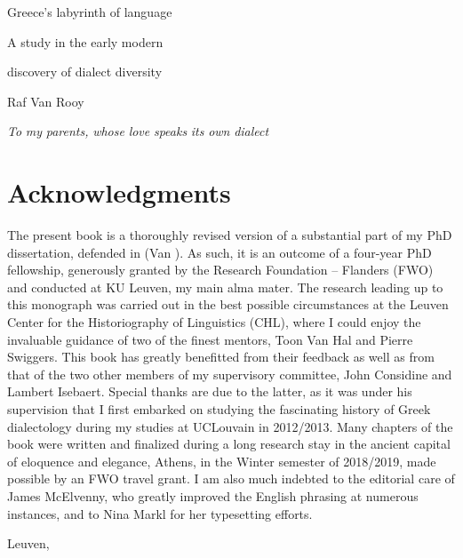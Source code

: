\documentclass[output=paper]{langsci/langscibook}
\author{\affiliation{}\orcid{}}
\title{}
\begin{document}
\maketitle 


Greece’s labyrinth of language

A study in the early modern

discovery of dialect diversity

Raf Van Rooy

\textit{To} \textit{my} \textit{parents,} \textit{whose} \textit{love} \textit{speaks} \textit{its} \textit{own} \textit{dialect}

\section{}
\hypertarget{Toc19704798}{}\setcounter{tocdepth}{3}
\renewcommand\contentsname{}
\tableofcontents

\section{Acknowledgments}
\hypertarget{Toc19704799}{}
The present book is a thoroughly revised version of a substantial part of my PhD dissertation, defended in \citealt{May2017} (Van \citealt{Rooy2017}). As such, it is an outcome of a four-year PhD fellowship, generously granted by the Research Foundation – Flanders (FWO) and conducted at KU Leuven, my main alma mater. The research leading up to this monograph was carried out in the best possible circumstances at the Leuven Center for the Historiography of Linguistics (CHL), where I could enjoy the invaluable guidance of two of the finest mentors, Toon Van Hal and Pierre Swiggers. This book has greatly benefitted from their feedback as well as from that of the two other members of my supervisory committee, John Considine and Lambert Isebaert. Special thanks are due to the latter, as it was under his supervision that I first embarked on studying the fascinating history of Greek dialectology during my studies at UCLouvain in 2012/2013. Many chapters of the book were written and finalized during a long research stay in the ancient capital of eloquence and elegance, Athens, in the Winter semester of 2018/2019, made possible by an FWO travel grant. I am also much indebted to the editorial care of James McElvenny, who greatly improved the English phrasing at numerous instances, and to Nina Markl for her typesetting efforts.

Leuven,
\end{document}
